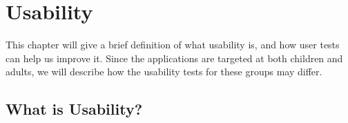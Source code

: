 \chapter{Usability}
\label{chp:usability}

This chapter will give a brief definition of what usability is, and how user tests can help us improve it. Since the applications are targeted at both children and adults, we will describe how the usability tests for these groups may differ.

\section{What is Usability?}
\label{sec:usability}
% 
% 
% 
% 
% 
% 
% 
